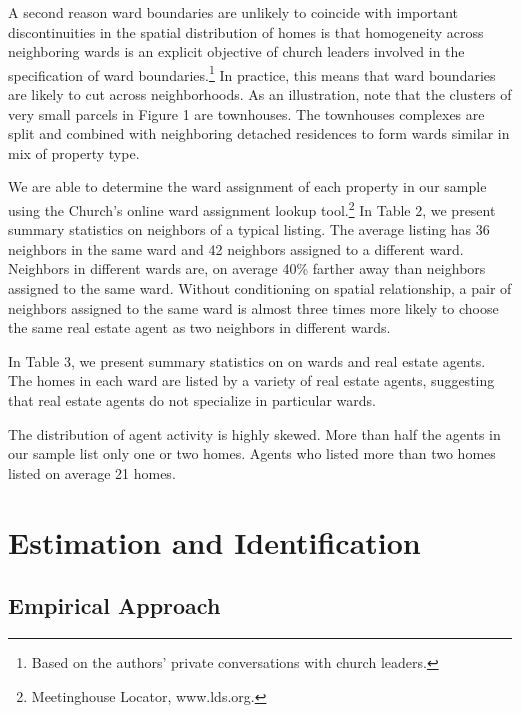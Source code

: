\documentclass[12pt]{article}
\begin{document}
    A second reason ward boundaries are unlikely to coincide with important discontinuities in the spatial distribution of homes
    is that homogeneity across neighboring wards is an explicit objective of church leaders involved in the specification of ward
    boundaries.\footnote{Based on the authors' private conversations with church leaders.}  In practice, this means that ward boundaries are likely to
    cut across neighborhoods.  As an illustration, note that the clusters of very small parcels in Figure 1
    are townhouses.  The townhouses complexes are split and combined with neighboring detached residences to form wards similar in mix of property type.

    We are able to determine the ward assignment of each property in our sample
    using the Church's online ward assignment lookup tool.\footnote{Meetinghouse Locator, www.lds.org.} In Table 2, we present summary statistics on neighbors of a typical listing.  The average listing has 36 neighbors in the same ward and 42
    neighbors assigned to a different ward.  Neighbors in different wards are, on average 40\% farther away than neighbors assigned to the same ward.
    Without conditioning on spatial relationship, a pair of neighbors assigned to the same ward is almost three times more likely to choose the same real estate agent as two neighbors in different
    wards.

    In Table 3, we present summary statistics on on wards and real estate agents. The homes in each ward are listed by a variety of real estate agents, suggesting that real estate agents do not specialize in particular wards.

    The distribution of agent activity is highly skewed.  More than half the agents in our
    sample list only one or two homes.  Agents who listed more than two homes listed on average 21 homes.

\section{Estimation and Identification}

\subsection*{Empirical Approach}
\end{document}
